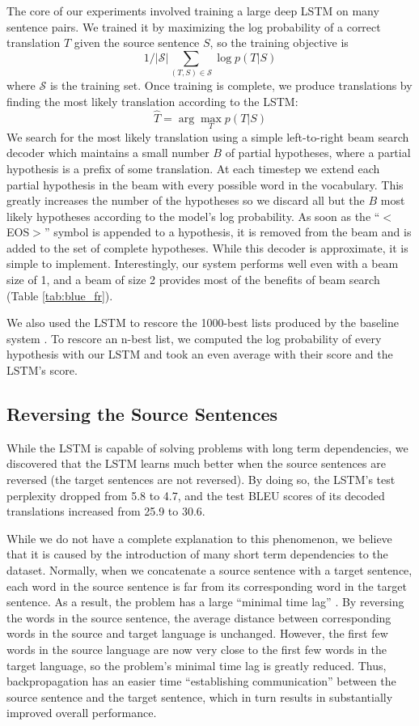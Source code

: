 \documentclass{article}
\begin{document}
The core of our experiments involved training a large deep LSTM on
many sentence pairs. We trained it by maximizing the log
probability of a correct translation $T$ given the source sentence
$S$, so the training objective is
$$1/|\mathcal S|\sum_{(T,S)\in\mathcal S}\log p(T|S)$$ where $\mathcal
S$ is the training set.  Once training is complete, we produce
translations by finding the most likely translation according to
the LSTM:
\begin{equation}
\label{eqn:decode}
\hat{T} = \arg\max_T p(T|S)
\end{equation}
We search for the most likely translation using a simple left-to-right
beam search decoder which maintains a small number $B$ of partial
hypotheses, where a partial hypothesis is a prefix of some
translation.  At each timestep we extend each partial hypothesis in
the beam with every possible word in the vocabulary. This greatly
increases the number of the hypotheses so we discard all but the $B$
most likely hypotheses according to the model's log probability.  As soon
as the ``$<$EOS$>$'' symbol is appended to a hypothesis, it is removed from
the beam and is added to the set of complete hypotheses.  While this
decoder is approximate, it is simple to implement.  Interestingly, our
system performs well even with a beam size of 1, and a beam of
size 2 provides most of the benefits of beam search (Table
\ref{tab:blue_fr}).   

We also used the LSTM to rescore the 1000-best lists produced by the
baseline system \cite{wmt14_en_fr}.  To rescore an n-best list, we
computed the log probability of every hypothesis with our LSTM and
took an even average with their score and the LSTM's score.

\subsection{Reversing the Source Sentences}
\label{sec:rev_rev}

While the LSTM is capable of solving problems with long term
dependencies, we discovered that the LSTM learns much better when the
source sentences are reversed (the target sentences are not reversed).  By
doing so, the LSTM's test perplexity dropped from 5.8 to 4.7, and the 
test BLEU scores of its decoded translations increased from 25.9 to 30.6.

While we do not have a complete explanation to this phenomenon, we
believe that it is caused by the introduction of many short term
dependencies to the dataset.  Normally, when we concatenate a source
sentence with a target sentence, each word in the source sentence is
far from its corresponding word in the target sentence. As a result,
the problem has a large ``minimal time lag'' \cite{minimal_time_lag}.  By reversing the
words in the source sentence, the average distance between
corresponding words in the source and target language is unchanged.
However, the first few words in the source language are now very close to
the first few words in the target language, so the problem's minimal
time lag is greatly reduced. Thus, backpropagation has an easier time
``establishing communication'' between the source sentence and the
target sentence, which in turn results in substantially improved overall
 performance.
\end{document}
